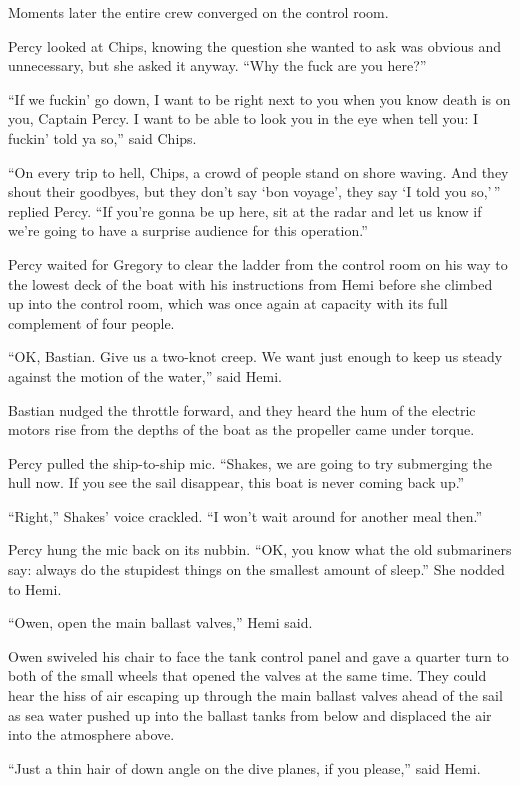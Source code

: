\documentclass[
]{scrbook}
\begin{document}
Moments later the entire crew converged on the control room.

Percy looked at Chips, knowing the question she wanted to ask was
obvious and unnecessary, but she asked it anyway. ``Why the fuck are you
here?''

``If we fuckin' go down, I want to be right next to you when you know
death is on you, Captain Percy. I want to be able to look you in the eye
when tell you: I fuckin' told ya so,'' said Chips.

``On every trip to hell, Chips, a crowd of people stand on shore waving.
And they shout their goodbyes, but they don't say `bon voyage', they say
`I told you so,'\,'' replied Percy. ``If you're gonna be up here, sit at
the radar and let us know if we're going to have a surprise audience for
this operation.''

Percy waited for Gregory to clear the ladder from the control room on
his way to the lowest deck of the boat with his instructions from Hemi
before she climbed up into the control room, which was once again at
capacity with its full complement of four people.

``OK, Bastian. Give us a two-knot creep. We want just enough to keep us
steady against the motion of the water,'' said Hemi.

Bastian nudged the throttle forward, and they heard the hum of the
electric motors rise from the depths of the boat as the propeller came
under torque.

Percy pulled the ship-to-ship mic. ``Shakes, we are going to try
submerging the hull now. If you see the sail disappear, this boat is
never coming back up.''

``Right,'' Shakes' voice crackled. ``I won't wait around for another
meal then.''

Percy hung the mic back on its nubbin. ``OK, you know what the old
submariners say: always do the stupidest things on the smallest amount
of sleep.'' She nodded to Hemi.

``Owen, open the main ballast valves,'' Hemi said.

Owen swiveled his chair to face the tank control panel and gave a
quarter turn to both of the small wheels that opened the valves at the
same time. They could hear the hiss of air escaping up through the main
ballast valves ahead of the sail as sea water pushed up into the ballast
tanks from below and displaced the air into the atmosphere above.

``Just a thin hair of down angle on the dive planes, if you please,''
said Hemi.
\end{document}
